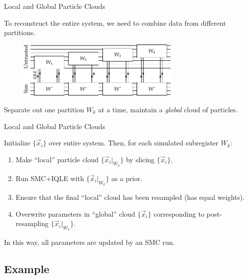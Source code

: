 \documentclass[xcolor=dvipsnames, compress]{beamer}
\newcommand{\ee}{\mathrm{e}}
\begin{document}
\begin{frame}{Local and Global Particle Clouds}
  
  To reconstruct the entire system, we need to combine data from different partitions.
  
  \begin{figure}
    \centering
    \includegraphics[width=0.7\textwidth]{figures/global-chain}
  \end{figure}

  Separate out one partition $W_k$ at a time, maintain a \emph{global} cloud of particles. 
  
\end{frame}

\begin{frame}{Local and Global Particle Clouds}

  Initialize $\{\vec{x}_i\}$ over entire system. Then, for each simulated subregister $W_k$:
  \begin{enumerate}
    \item Make ``local'' particle cloud $\{\vec{x}_i|_{W_k}\}$ by slicing $\{\vec{x}_i\}$.
    \item Run SMC+IQLE with $\{\vec{x}_i|_{W_k}\}$ as a prior.
    \item Ensure that the final ``local'' cloud has been resampled (has equal weights).
    \item Overwrite parameters in ``global'' cloud $\{\vec{x}_i\}$ corresponding
      to post-resampling $\{\vec{x}_i|_{W_k}\}$.
  \end{enumerate}

  In this way, all parameters are updated by an SMC run.

\end{frame}

\subsection{Example}

\end{document}

